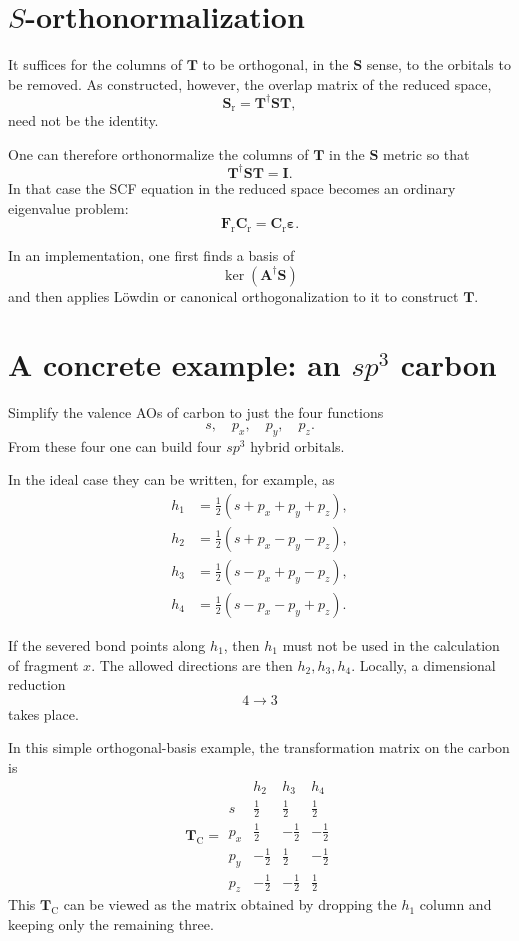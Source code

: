 \documentclass[11pt]{article}
\newcommand{\Smat}{\mathbf S}
\newcommand{\Amat}{\mathbf A}
\newcommand{\Tmat}{\mathbf T}
\newcommand{\Cr}{\mathbf C_{\mathrm r}}
\newcommand{\Fr}{\mathbf F_{\mathrm r}}
\newcommand{\Sr}{\mathbf S_{\mathrm r}}
\begin{document}
\section{\(S\)-orthonormalization}

It suffices for the columns of \(\Tmat\) to be orthogonal, in the
\(\Smat\) sense, to the orbitals to be removed. As constructed,
however, the overlap matrix of the reduced space,
\[
  \Sr=\Tmat^\dagger\Smat\Tmat ,
\]
need not be the identity.

One can therefore orthonormalize the columns of \(\Tmat\) in the
\(\Smat\) metric so that
\[
  \Tmat^\dagger\Smat\Tmat=\mathbf I .
\]
In that case the SCF equation in the reduced space becomes an ordinary
eigenvalue problem:
\[
  \Fr\Cr=\Cr\boldsymbol\varepsilon .
\]

In an implementation, one first finds a basis of
\[
  \ker(\Amat^\dagger\Smat)
\]
and then applies L\"owdin or canonical orthogonalization to it to
construct \(\Tmat\).

\section{A concrete example: an \(sp^3\) carbon}

Simplify the valence AOs of carbon to just the four functions
\[
  s,\quad p_x,\quad p_y,\quad p_z .
\]
From these four one can build four \(sp^3\) hybrid orbitals.

In the ideal case they can be written, for example, as
\begin{align*}
h_1 &= \frac12(s+p_x+p_y+p_z), \\
h_2 &= \frac12(s+p_x-p_y-p_z), \\
h_3 &= \frac12(s-p_x+p_y-p_z), \\
h_4 &= \frac12(s-p_x-p_y+p_z).
\end{align*}

If the severed bond points along \(h_1\), then \(h_1\) must not be used
in the calculation of fragment \(x\). The allowed directions are then
\(h_2,h_3,h_4\). Locally, a dimensional reduction
\[
  4\to 3
\]
takes place.

In this simple orthogonal-basis example, the transformation matrix on
the carbon is
\[
\Tmat_{\mathrm C}
=
\begin{array}{c|ccc}
 & h_2 & h_3 & h_4\\
\hline
s   & \frac12 & \frac12  & \frac12 \\
p_x & \frac12 & -\frac12 & -\frac12 \\
p_y & -\frac12 & \frac12 & -\frac12 \\
p_z & -\frac12 & -\frac12 & \frac12
\end{array}
\]
This \(\Tmat_{\mathrm C}\) can be viewed as the matrix obtained by
dropping the \(h_1\) column and keeping only the remaining three.
\end{document}
